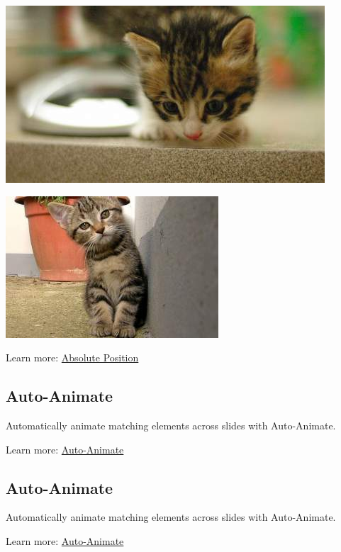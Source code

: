\documentclass[
  letterpaper,
  DIV=11,
  numbers=noendperiod]{scrartcl}
\begin{document}
\includegraphics[width=4.6875in,height=\textheight]{mini/images/kitten-450-250.jpeg}

\includegraphics[width=3.125in,height=\textheight]{mini/images/kitten-300-200.jpeg}

Learn more:
\href{https://quarto.org/docs/presentations/revealjs/advanced.html\#absolute-position}{Absolute
Position}

\hypertarget{auto-animate}{%
\subsection{Auto-Animate}\label{auto-animate}}

Automatically animate matching elements across slides with Auto-Animate.

Learn more:
\href{https://quarto.org/docs/presentations/revealjs/advanced.html\#auto-animate}{Auto-Animate}

\hypertarget{auto-animate-1}{%
\subsection{Auto-Animate}\label{auto-animate-1}}

Automatically animate matching elements across slides with Auto-Animate.

Learn more:
\href{https://quarto.org/docs/presentations/revealjs/advanced.html\#auto-animate}{Auto-Animate}
\end{document}
